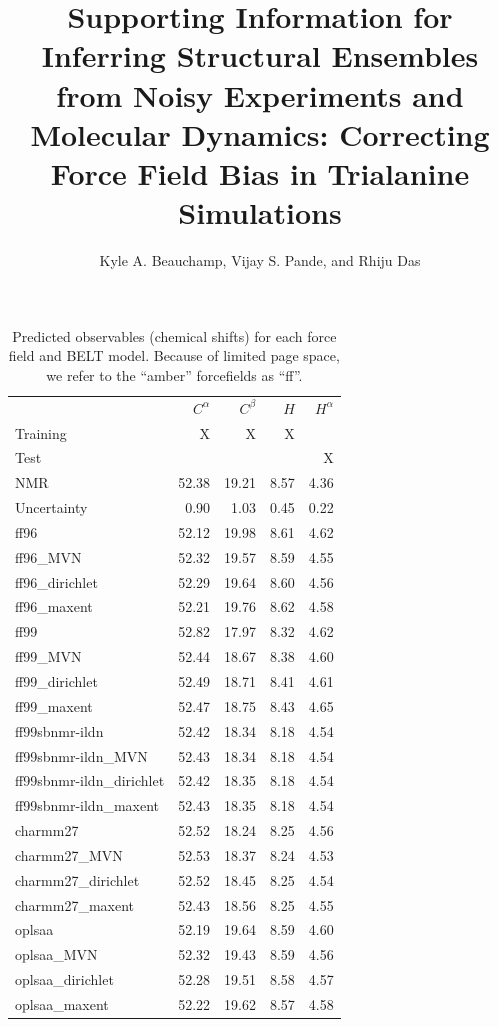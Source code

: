 \documentclass[12pt]{article}
\author{Kyle A. Beauchamp, Vijay S. Pande, and Rhiju Das}
\title{Supporting Information for Inferring Structural Ensembles from Noisy Experiments and Molecular Dynamics: Correcting Force Field Bias in Trialanine Simulations}
\begin{document}
\maketitle


\newpage

\begin{table}
 
\begin{tabular}{lrrrr}
\toprule
  &    $C^\alpha$ &    $C^\beta$ &    $H$ &   $H^\alpha$ \\
Training & X & X & X & \\                    
Test & &  & & X \\
NMR                         & 52.38 & 19.21 & 8.57 & 4.36 \\
Uncertainty                 &  0.90 &  1.03 & 0.45 & 0.22 \\

\toprule
ff96                     & 52.12 & 19.98 & 8.61 & 4.62 \\
ff96\_MVN                 & 52.32 & 19.57 & 8.59 & 4.55 \\
ff96\_dirichlet           & 52.29 & 19.64 & 8.60 & 4.56 \\
ff96\_maxent              & 52.21 & 19.76 & 8.62 & 4.58 \\
\toprule
ff99                     & 52.82 & 17.97 & 8.32 & 4.62 \\
ff99\_MVN                 & 52.44 & 18.67 & 8.38 & 4.60 \\
ff99\_dirichlet           & 52.49 & 18.71 & 8.41 & 4.61 \\
ff99\_maxent              & 52.47 & 18.75 & 8.43 & 4.65 \\
\toprule
ff99sbnmr-ildn           & 52.42 & 18.34 & 8.18 & 4.54 \\
ff99sbnmr-ildn\_MVN       & 52.43 & 18.34 & 8.18 & 4.54 \\
ff99sbnmr-ildn\_dirichlet & 52.42 & 18.35 & 8.18 & 4.54 \\
ff99sbnmr-ildn\_maxent    & 52.43 & 18.35 & 8.18 & 4.54 \\
\toprule
charmm27                    & 52.52 & 18.24 & 8.25 & 4.56 \\
charmm27\_MVN                & 52.53 & 18.37 & 8.24 & 4.53 \\
charmm27\_dirichlet          & 52.52 & 18.45 & 8.25 & 4.54 \\
charmm27\_maxent             & 52.43 & 18.56 & 8.25 & 4.55 \\
\toprule
oplsaa                      & 52.19 & 19.64 & 8.59 & 4.60 \\
oplsaa\_MVN                  & 52.32 & 19.43 & 8.59 & 4.56 \\
oplsaa\_dirichlet            & 52.28 & 19.51 & 8.58 & 4.57 \\
oplsaa\_maxent               & 52.22 & 19.62 & 8.57 & 4.58 \\
\bottomrule


\end{tabular}
\caption{
Predicted observables (chemical shifts) for each force field and BELT model.  Because of limited page space, we refer to the ``amber'' forcefields as ``ff''.  
}
\end{table}
\newpage
\end{document}
